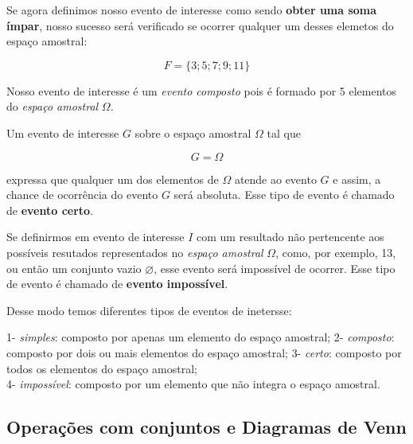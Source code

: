 \documentclass[
]{book}
\begin{document}
\hfill\break

Se agora definimos nosso evento de interesse como sendo \textbf{obter uma soma ímpar}, nosso sucesso será verificado se ocorrer qualquer um desses elemetos do espaço amostral:

\hfill\break

\[
F=\{3;5;7;9;11\}
\]

\hfill\break

Nosso evento de interesse é um \emph{evento composto} pois é formado por 5 elementos do \emph{espaço amostral} \(\Omega\).

\hfill\break

Um evento de interesse \(G\) sobre o espaço amostral \(\Omega\) tal que

\hfill\break

\[
G=\Omega
\]

\hfill\break

expressa que qualquer um dos elementos de \(\Omega\) atende ao evento \(G\) e assim, a chance de ocorrência do evento \(G\) será absoluta. Esse tipo de evento é chamado de \textbf{evento certo}.

\hfill\break

Se definirmos em evento de interesse \(I\) com um resultado não pertencente aos possíveis resutados representados no \emph{espaço amostral} \(\Omega\), como, por exemplo, 13, ou então um conjunto vazio \(\varnothing\), esse evento será impossível de ocorrer. Esse tipo de evento é chamado de \textbf{evento impossível}.

\hfill\break

Desse modo temos diferentes tipos de eventos de inetersse:

\hfill\break

1- \emph{simples}: composto por apenas um elemento do espaço amostral;
2- \emph{composto}: composto por dois ou mais elementos do espaço amostral;
3- \emph{certo}: composto por todos os elementos do espaço amostral;\\
4- \emph{impossível}: composto por um elemento que não integra o espaço amostral.

\hfill\break

\hypertarget{operauxe7uxf5es-com-conjuntos-e-diagramas-de-venn}{%
\subsection{Operações com conjuntos e Diagramas de Venn}\label{operauxe7uxf5es-com-conjuntos-e-diagramas-de-venn}}
\end{document}
